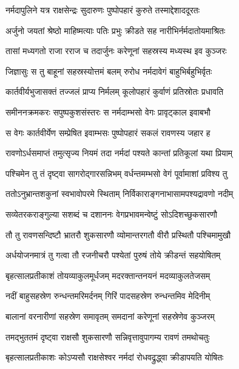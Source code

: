 
\twolineshloka
{नर्मदापुलिने यत्र राक्षसेन्द्रः सुदारुणः}
{पुष्पोपहारं कुरुते तस्माद्देशाददूरतः} %

\twolineshloka
{अर्जुनो जयतां श्रेष्ठो माहिष्मत्याः पतिः प्रभुः}
{क्रीडते सह नारीभिर्नर्मदातोयमाश्रितः} %

\twolineshloka
{तासां मध्यगतो राजा रराज च तदार्जुनः}
{करेणूनां सहस्रस्य मध्यस्थ इव कुञ्जरः} %

\twolineshloka
{जिज्ञासुः स तु बाहूनां सहस्रस्योत्तमं बलम्}
{रुरोध नर्मदावेगं बाहुभिर्बहुभिर्वृतः} %

\twolineshloka
{कार्तवीर्यभुजासक्तं तज्जलं प्राप्य निर्मलम्}
{कूलोपहारं कुर्वाणं प्रतिस्रोतः प्रधावति} %

\twolineshloka
{समीननक्रमकरः सपुष्पकुशसंस्तरः}
{स नर्मदाम्भसो वेगः प्रावृट्काल इवाबभौ} %

\twolineshloka
{स वेगः कार्तवीर्येण सम्प्रेषित इवाम्भसः}
{पुष्पोपहारं सकलं रावणस्य जहार ह} %

\twolineshloka
{रावणोऽर्धसमाप्तं तमुत्सृज्य नियमं तदा}
{नर्मदां पश्यते कान्तां प्रतिकूलां यथा प्रियाम्} %

\twolineshloka
{पश्चिमेन तु तं दृष्ट्वा सागरोद्गारसन्निभम्}
{वर्धन्तमम्भसो वेगं पूर्वामाशां प्रविश्य तु} %

\twolineshloka
{ततोऽनुभ्रान्तशकुनां स्वभावोपरमे स्थिताम्}
{निर्विकाराङ्गनाभासामपश्यद्रावणो नदीम्} %

\twolineshloka
{सव्येतरकराङ्गुल्या सशब्दं च दशाननः}
{वेगप्रभावमन्वेष्टुं सोऽदिशच्छुकसारणौ} %

\twolineshloka
{तौ तु रावणसन्दिष्टौ भ्रातरौ शुकसारणौ}
{व्योमान्तरगतौ वीरौ प्रस्थितौ पश्चिमामुखौ} %

\twolineshloka
{अर्धयोजनमात्रं तु गत्वा तौ रजनीचरौ}
{पश्येतां पुरुषं तोये क्रीडन्तं सहयोषितम्} %

\twolineshloka
{बृहत्सालप्रतीकाशं तोयव्याकुलमूर्धजम्}
{मदरक्तान्तनयनं मदव्याकुलतेजसम्} %

\twolineshloka
{नदीं बाहुसहस्रेण रुन्धन्तमरिमर्दनम्}
{गिरिं पादसहस्रेण रुन्धन्तमिव मेदिनीम्} %

\twolineshloka
{बालानां वरनारीणां सहस्रेण समावृतम्}
{समदानां करेणूनां सहस्रेणेव कुञ्जरम्} %

\twolineshloka
{तमद्भुततमं दृष्ट्वा राक्षसौ शुकसारणौ}
{सन्निवृत्तावुपागम्य रावणं तमथोचतुः} %

\twolineshloka
{बृहत्सालप्रतीकाशः कोऽप्यसौ राक्षसेश्वर}
{नर्मदां रोधवद्रुद्ध्वा क्रीडापयति योषितः} %


